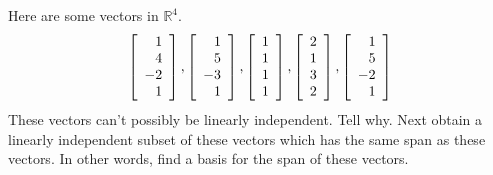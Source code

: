 \begin{enumialphparenastyle}
\begin{ex} Here are some vectors in $\mathbb{R}^{4}$. 
\begin{equation*}
\left[ 
\begin{array}{r}
1 \\ 
4 \\ 
-2 \\ 
1
\end{array}
\right] ,\left[ 
\begin{array}{r}
1 \\ 
5 \\ 
-3 \\ 
1
\end{array}
\right] ,\left[ 
\begin{array}{r}
1 \\ 
1 \\ 
1 \\ 
1
\end{array}
\right] ,\left[ 
\begin{array}{r}
2 \\ 
1 \\ 
3 \\ 
2
\end{array}
\right] ,\left[ 
\begin{array}{r}
1 \\ 
5 \\ 
-2 \\ 
1
\end{array}
\right]
\end{equation*}
These vectors can't possibly be linearly independent. Tell why. Next obtain a
linearly independent subset of these vectors which has the same span as
these vectors. In other words, find a basis for the span of these vectors.
\end{ex}


\end{enumialphparenastyle}
